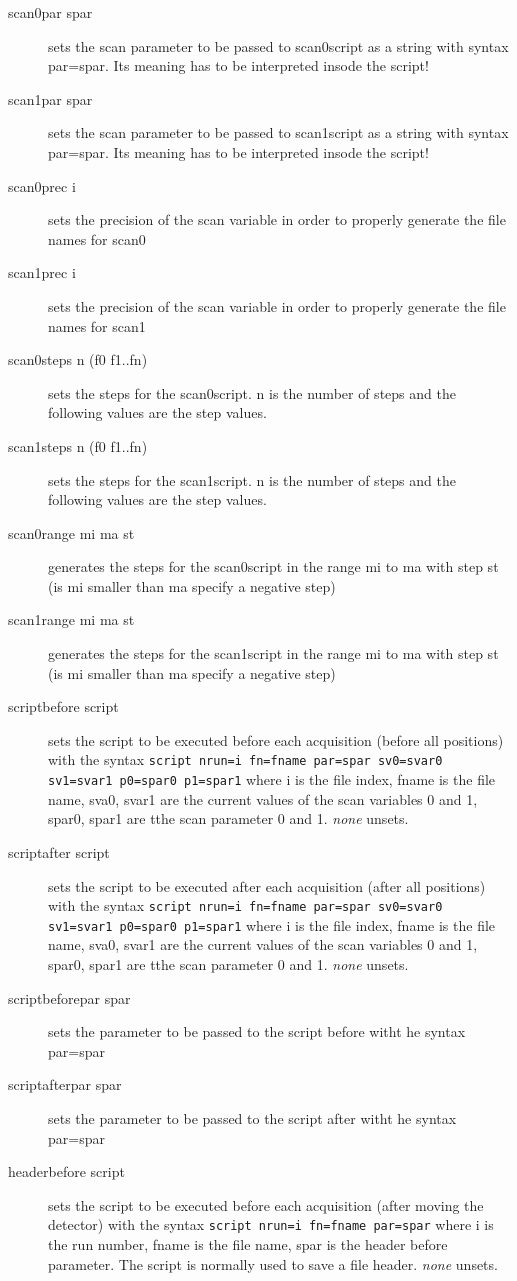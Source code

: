 \documentclass{report}
\begin{document}
\begin{description}
\item[scan0par spar] sets the scan parameter to be passed to scan0script as a string with syntax par=spar. Its meaning has to be interpreted insode the script! 
\item[scan1par spar] sets the scan parameter to be passed to scan1script as a string with syntax par=spar. Its meaning has to be interpreted insode the script! 
\item[scan0prec i] sets the precision of the scan variable in order to properly generate the file names for scan0
\item[scan1prec i] sets the precision of the scan variable in order to properly generate the file names for scan1
\item[scan0steps n (f0 f1..fn)] sets the steps for the scan0script. n is the number of steps and the following values are the step values.
\item[scan1steps n (f0 f1..fn)]  sets the steps for the scan1script. n is the number of steps and the following values are the step values.
\item[scan0range mi ma st] generates the steps for the scan0script in the range mi to ma with step st (is mi smaller than ma specify a negative step)
\item[scan1range mi ma st] generates the steps for the scan1script in the range mi to ma with step st (is mi smaller than ma specify a negative step)
\item[scriptbefore script] sets the script to be executed before each acquisition (before all positions) with the syntax \verb|script nrun=i fn=fname par=spar sv0=svar0 sv1=svar1 p0=spar0 p1=spar1| where i is the file index, fname is the file name, sva0, svar1 are the current values of the scan variables 0 and 1, spar0, spar1 are tthe scan parameter 0 and 1. \textit{none} unsets.
\item[scriptafter script] sets the script to be executed after each acquisition (after all positions) with the syntax \verb|script nrun=i fn=fname par=spar sv0=svar0 sv1=svar1 p0=spar0 p1=spar1| where i is the file index, fname is the file name, sva0, svar1 are the current values of the scan variables 0 and 1, spar0, spar1 are tthe scan parameter 0 and 1. \textit{none} unsets.
\item[scriptbeforepar spar] sets the parameter to be passed to the script before witht he syntax par=spar 
\item[scriptafterpar spar] sets the parameter to be passed to the script after witht he syntax par=spar 
\item[headerbefore script] sets the script to be executed before each acquisition (after moving the detector) with the syntax \verb|script nrun=i fn=fname par=spar| where i is the run number, fname is the file name, spar is the header before parameter. The script is normally used to save a file header. \textit{none} unsets.

\end{description}
\end{document}
